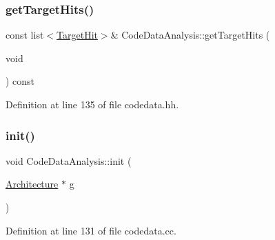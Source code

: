 \subsubsection{\texorpdfstring{getTargetHits()}{getTargetHits()}}
{\footnotesize\ttfamily const list$<$\mbox{\hyperlink{class_target_hit}{Target\+Hit}}$>$\& Code\+Data\+Analysis\+::get\+Target\+Hits (\begin{DoxyParamCaption}\item[{void}]{ }\end{DoxyParamCaption}) const\hspace{0.3cm}{\ttfamily [inline]}}



Definition at line 135 of file codedata.\+hh.

\mbox{\label{class_code_data_analysis_a0d201fd15ac961362b9dc8b51134bea3}} 
\subsubsection{\texorpdfstring{init()}{init()}}
{\footnotesize\ttfamily void Code\+Data\+Analysis\+::init (\begin{DoxyParamCaption}\item[{\mbox{\hyperlink{class_architecture}{Architecture}} $\ast$}]{g }\end{DoxyParamCaption})}



Definition at line 131 of file codedata.\+cc.

